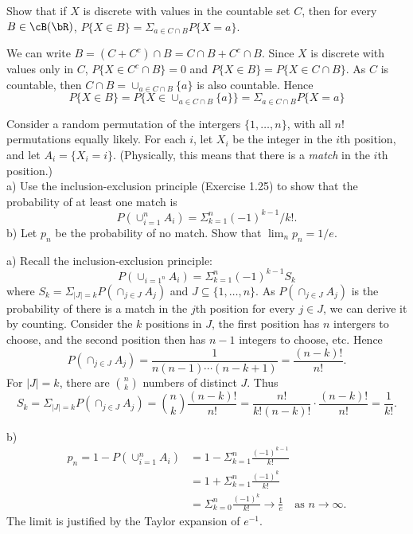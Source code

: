 \begin{exercise}
  Show that if $X$ is discrete with values in the countable set $C$, then for every $B\in\cB(\bR)$, $P\{X\in B\}=\Sigma_{a\in C\cap B}P\{X=a\}$.
\end{exercise}
\begin{solution}
  We can write $B=(C+C^c)\cap B=C\cap B+C^c\cap B$. Since $X$ is discrete with values only in $C$, $P\{X\in C^c\cap B\}=0$ and $P\{X\in B\} = P\{X\in C\cap B\}$. As $C$ is countable, then $C\cap B = \cup_{a\in C\cap B}\{a\}$ is also countable. Hence
  \[ P\{X\in B\} = P\{X\in\cup_{a\in C\cap B}\{a\}\} = \Sigma_{a\in C\cap B}P\{X=a\} \]
\end{solution}


\begin{exercise}
  Consider a random permutation of the intergers $\{1,\ldots,n\}$, with all $n!$ permutations equally likely. For each $i$, let $X_i$ be the integer in the $i$th position, and let $A_i=\{X_i=i\}$. (Physically, this means that there is a \textit{match} in the $i$th position.) \\
  a) Use the inclusion-exclusion principle (Exercise 1.25) to show that the probability of at least one match is
  \[ P(\cup_{i=1}^nA_i) = \Sigma_{k=1}^n (-1)^{k-1}/k!. \]
  b) Let $p_n$ be the probability of no match. Show that $\lim_n p_n=1/e$.
\end{exercise}
\begin{solution}
  a) Recall the inclusion-exclusion principle:
  \[ P(\cup_{i=1^n}A_i) = \Sigma_{k=1}^n(-1)^{k-1}S_k \]
  where $S_k = \Sigma_{|J|=k} P(\cap_{j\in J}A_j)$ and $J\subseteq\{1,\ldots,n\}$. As $P(\cap_{j\in J}A_j)$ is the probability of there is a match in the $j$th position for every $j\in J$, we can derive it by counting. Consider the $k$ positions in $J$, the first position has $n$ intergers to choose, and the second position then has $n-1$ integers to choose, etc. Hence
  \[ P(\cap_{j\in J}A_j) = \frac{1}{n(n-1)\cdots(n-k+1)} = \frac{(n-k)!}{n!} .\]
  For $|J|=k$, there are $\binom{n}{k}$ numbers of distinct $J$. Thus
  \[ S_k = \Sigma_{|J|=k}P(\cap_{j\in J}A_j) = \binom{n}{k}\frac{(n-k)!}{n!} = \frac{n!}{k!(n-k)!}\cdot\frac{(n-k)!}{n!} = \frac{1}{k!} .\]

  b)\begin{align*}
    p_n = 1 - P(\cup_{i=1}^n A_i) &= 1 - \Sigma_{k=1}^n\frac{(-1)^{k-1}}{k!} \\
      &= 1 + \Sigma_{k=1}^n\frac{(-1)^{k}}{k!} \\
      &= \Sigma_{k=0}^n\frac{(-1)^{k}}{k!} \to \frac{1}{e} \quad\mbox{as $n\to\infty$} .
  \end{align*}
  The limit is justified by the Taylor expansion of $e^{-1}$.
\end{solution}

